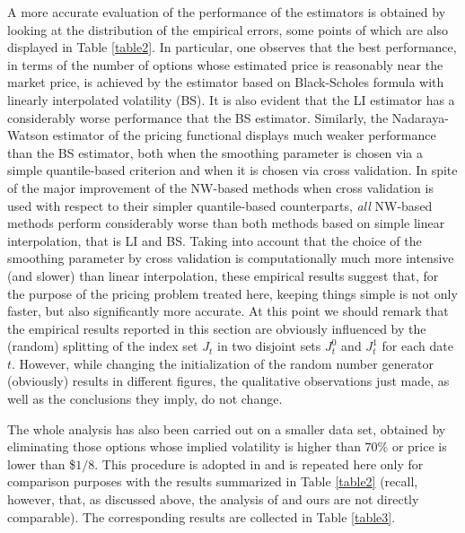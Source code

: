 \documentclass[11pt]{article}
\theoremstyle{remark}
\begin{document}
A more accurate evaluation of the performance of the estimators is
obtained by looking at the distribution of the empirical errors, some
points of which are also displayed in Table \ref{table2}. In
particular, one observes that the best performance, in terms of the
number of options whose estimated price is reasonably near the market
price, is achieved by the estimator based on Black-Scholes formula
with linearly interpolated volatility (BS). It is also evident that
the LI estimator has a considerably worse performance that the BS
estimator. Similarly, the Nadaraya-Watson estimator of the pricing
functional displays much weaker performance than the BS
estimator, both when the smoothing parameter is chosen via a simple
quantile-based criterion and when it is chosen via cross
validation. In spite of the major improvement of the NW-based methods
when cross validation is used with respect to their simpler
quantile-based counterparts, \emph{all} NW-based methods perform
considerably worse than both methods based on simple linear
interpolation, that is LI and BS. Taking into account that the choice
of the smoothing parameter by cross validation is computationally much
more intensive (and slower) than linear interpolation, these empirical
results suggest that, for the purpose of the pricing problem treated
here, keeping things simple is not only faster, but also significantly
more accurate. At this point we should remark that the empirical
results reported in this section are obviously influenced by the
(random) splitting of the index set $J_t$ in two disjoint sets $J_t^0$
and $J_t^1$ for each date $t$. However, while changing the
initialization of the random number generator (obviously) results in
different figures, the qualitative observations just made, as well as
the conclusions they imply, do not change.

\medskip

The whole analysis has also been carried out on a smaller data set,
obtained by eliminating those options whose implied volatility is
higher than $70$\% or price is lower than
\$$1/8$. This procedure is adopted in \cite{AL} and is repeated here
only for comparison purposes with the results summarized in Table
\ref{table2} (recall, however, that, as discussed above, the analysis
of \cite{AL} and ours are not directly comparable). The corresponding
results are collected in Table \ref{table3}. 
\end{document}
